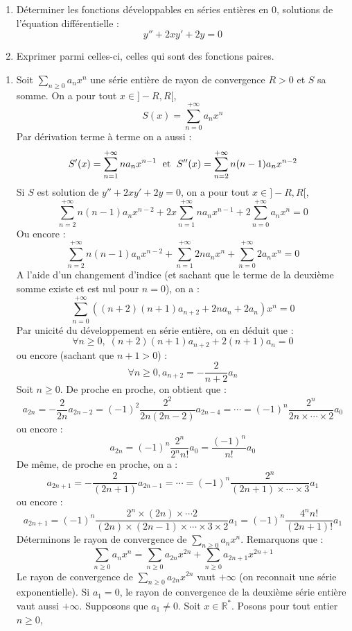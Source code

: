 \documentclass[a4paper,10pt]{report}
\newcommand{\Sum}[2]{\ensuremath{\textstyle{\sum\limits_{#1}^{#2}}}}
\begin{document}
\begin{Exercice}{} \begin{enumerate}
  \item Déterminer les fonctions développables en séries entières en $0$, solutions de l'équation différentielle :
    \[
    y'' + 2xy' + 2y = 0
    \]
  \item Exprimer parmi celles-ci, celles qui sont des fonctions paires.
  \end{enumerate}
\end{Exercice} 

\newpage

\corr 
\begin{enumerate}
\item Soit $\Sum{n \geq 0}{} a_n x^n$ une série entière de rayon de convergence $R>0$ et $S$ sa somme. On a pour tout $x \in ]-R,R[$,
$$ S(x) = \sum_{n=0}^{+ \infty} a_n x^n$$
Par dérivation terme à terme on a aussi :
$$ S'(x) = \sum_{n=1}^{+ \infty} n a_n x^{n-1} \; \hbox{ et } \; S''(x) = \sum_{n=2}^{+ \infty} n(n-1) a_n x^{n-2}$$
Si $S$ est solution de $y'' + 2xy' + 2y = 0$, on a pour tout $x \in ]-R,R[$,
$$ \sum_{n=2}^{+ \infty} n(n-1) a_n x^{n-2} + 2x \sum_{n=1}^{+ \infty} n a_n x^{n-1} + 2\sum_{n=0}^{+ \infty} a_n x^n = 0$$
Ou encore :
$$ \sum_{n=2}^{+ \infty} n(n-1) a_n x^{n-2} +  \sum_{n=1}^{+ \infty} 2n a_n x^{n} + \sum_{n=0}^{+ \infty} 2a_n x^n = 0$$
A l'aide d'un changement d'indice (et sachant que le terme de la deuxième somme existe et est nul pour $n=0$), on a :
$$ \sum_{n=0}^{+ \infty}  ((n+2)(n+1) a_{n+2} + 2n a_n + 2a_n)x^n = 0$$
Par unicité du développement en série entière, on en déduit que :
$$ \forall n \geq 0, \; (n+2)(n+1) a_{n+2} + 2(n+1) a_n =0$$
ou encore (sachant que $n+1>0$) :
$$ \forall n \geq 0, a_{n+2} = -\dfrac{2}{n+2} a_n $$
Soit $n \geq 0$. De proche en proche, on obtient que :
$$ a_{2n} = - \dfrac{2}{2n} a_{2n-2} = (-1)^2 \dfrac{2^2}{2n(2n-2)} a_{2n-4} = \cdots = (-1)^n \dfrac{2^n}{2n \times \cdots \times 2} a_0$$
ou encore :
$$ a_{2n} = (-1)^n \dfrac{2^n}{2^n n!} a_0 = \dfrac{(-1)^n}{n!} a_0 $$
De même, de proche en proche, on a :
$$ a_{2n+1} = - \dfrac{2}{(2n+1)} a_{2n-1} = \cdots = (-1)^n \dfrac{2^n}{(2n+1) \times \cdots \times 3} a_1$$
ou encore :
$$ a_{2n+1} = (-1)^n \dfrac{2^n \times (2n) \times \cdots 2}{(2n) \times(2n-1) \times \cdots \times 3 \times 2} a_1 = (-1)^n \dfrac{4^n n!}{(2n+1)!} a_1$$
Déterminons le rayon de convergence de $\Sum{n \geq 0}{} a_n x^n$. Remarquons que :
$$ \sum_{n \geq 0} a_n x^n = \sum_{n \geq 0} a_{2n} x^{2n} + \sum_{n \geq 0} a_{2n+1} x^{2n+1}$$
Le rayon de convergence de $\Sum{n \geq 0}{} a_{2n} x^{2n}$ vaut $+ \infty$ (on reconnait une série exponentielle). Si $a_1=0$, le rayon de convergence de la deuxième série entière vaut aussi $+ \infty$. Supposons que $a_1 \neq 0$. Soit $x \in \mathbb{R}^*$. Posons pour tout entier $n \geq 0$,

\end{enumerate}
\end{document}
